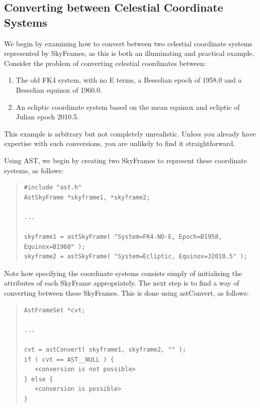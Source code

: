 \documentclass[twoside,11pt]{article}
\newcommand{\htmlref}[2]{#1}
\begin{document}
\subsection{\label{ss:convertingskyframes}Converting between Celestial Coordinate Systems}

We begin by examining how to convert between two celestial coordinate
systems represented by SkyFrames, as this is both an illuminating and
practical example.  Consider the problem of converting celestial
coordinates between:

\begin{enumerate}
\item The old FK4 system, with no E terms, a Besselian epoch of
1958.0 and a Besselian equinox of 1960.0.

\item An ecliptic coordinate system based on the mean equinox and
ecliptic of Julian epoch 2010.5.
\end{enumerate}

This example is arbitrary but not completely unrealistic. Unless you
already have expertise with such conversions, you are unlikely to find
it straightforward.

Using AST, we begin by creating two SkyFrames to represent these
coordinate systems, as follows:

\begin{quote}
\small
\begin{verbatim}
#include "ast.h"
AstSkyFrame *skyframe1, *skyframe2;

...

skyframe1 = astSkyFrame( "System=FK4-NO-E, Epoch=B1958, Equinox=B1960" );
skyframe2 = astSkyFrame( "System=Ecliptic, Equinox=J2010.5" );
\end{verbatim}
\normalsize
\end{quote}

Note how specifying the coordinate systems consists simply of
initialising the attributes of each \htmlref{SkyFrame}{SkyFrame} appropriately.  The next
step is to find a way of converting between these SkyFrames. This is
done using \htmlref{astConvert}{astConvert}, as follows:

\begin{quote}
\small
\begin{verbatim}
AstFrameSet *cvt;

...

cvt = astConvert( skyframe1, skyframe2, "" );
if ( cvt == AST__NULL ) {
   <conversion is not possible>
} else {
   <conversion is possible>
}
\end{verbatim}
\normalsize
\end{quote}
\end{document}
